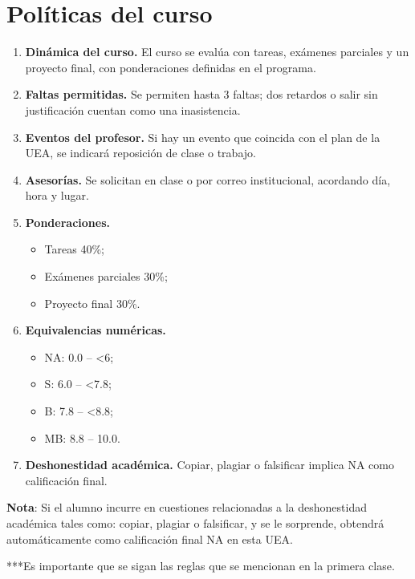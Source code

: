 \documentclass[12pt]{article}
\begin{document}
	\begingroup
	\renewcommand{\refname}{}%
	\nocite{*}                  %
	
	\endgroup
	
	
	
	\section*{Políticas del curso}
	
	\begin{enumerate}
		\item \textbf{Dinámica del curso.} El curso se evalúa con tareas, exámenes parciales y un proyecto final, con ponderaciones definidas en el programa.
		\item \textbf{Faltas permitidas.} Se permiten hasta 3 faltas; dos retardos o salir sin justificación cuentan como una inasistencia. 
		\item \textbf{Eventos del profesor.} Si hay un evento que coincida con el plan de la UEA, se indicará reposición de clase o trabajo. 
		\item \textbf{Asesorías.} Se solicitan en clase o por correo institucional, acordando día, hora y lugar. 
		\item \textbf{Ponderaciones.} \begin{itemize}
			\item Tareas 40\%; 
			\item Exámenes parciales 30\%; 
			\item Proyecto final 30\%. 
		\end{itemize}
		\item \textbf{Equivalencias numéricas.} 
		\begin{itemize}
			\item NA: 0.0 – <6; 
			\item 		S: 6.0 – <7.8; 
			\item 		B: 7.8 – <8.8; 
			\item 		MB: 8.8 – 10.0.
		\end{itemize}
		\item \textbf{Deshonestidad académica.} Copiar, plagiar o falsificar implica NA como calificación final.
	\end{enumerate}
	
	
	
	\textbf{Nota}: Si el alumno incurre en cuestiones relacionadas a la deshonestidad académica tales como: copiar, plagiar o falsificar, y se le sorprende, obtendrá automáticamente como calificación final NA en esta UEA. 
	
	***Es importante que se sigan las reglas que se mencionan en la primera clase.
	
	
	
%	
%	
	
\end{document}
